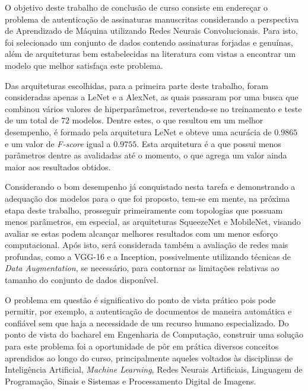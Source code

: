 
O objetivo deste trabalho de conclusão de curso consiste em endereçar o problema de autenticação de assinaturas manuscritas considerando a perspectiva de Aprendizado de Máquina utilizando Redes Neurais Convolucionais. Para isto, foi selecionado um conjunto de dados contendo assinaturas forjadas e genuínas, além de arquiteturas bem estabelecidas na literatura com vistas a encontrar um modelo que melhor satisfaça este problema.

Das arquiteturas escolhidas, para a primeira parte deste trabalho, foram consideradas apenas a LeNet e a AlexNet, as quais passaram por uma busca que combinou vários valores de hiperparâmetros, revertendo-se no treinamento e teste de um total de $72$ modelos. Dentre estes, o que resultou em um melhor desempenho, é formado pela arquitetura LeNet e obteve uma acurácia de $0.9865$ e um valor de \emph{F-score} igual a $0.9755$. Esta arquitetura é a que possui menos parâmetros dentre as avalidadas até o momento, o que agrega um valor ainda maior aos resultados obtidos.


Considerando o bom desempenho já conquistado nesta tarefa e demonstrando a adequação dos modelos para o que foi proposto, tem-se em mente, na próxima etapa deste trabalho, prosseguir primeiramente com topologias que possuam menos parâmetros, em especial, as arquiteturas SqueezeNet e MobileNet, visando avaliar se estas podem alcançar melhores resultados com um menor esforço computacional. Após isto, será considerada também a avaliação de redes mais profundas, como a VGG-16 e a Inception, possivelmente utilizando técnicas de \emph{Data Augmentation}, se necessário, para contornar as limitações relativas ao tamanho do conjunto de dados disponível.

O problema em questão é significativo do ponto de vista prático pois pode permitir, por exemplo, a autenticação de documentos de maneira automática e confiável sem que haja a necessidade de um recurso humano especializado. Do ponto de vista do bacharel em Engenharia de Computação, construir uma solução para este problema foi a oportunidade de pôr em prática diversos conceitos aprendidos ao longo do curso, principalmente aqueles voltados às disciplinas de Inteligência Artificial, \emph{Machine Learning}, Redes Neurais Artificiais, Linguagem de Programação, Sinais e Sistemas e Processamento Digital de Imagens.
